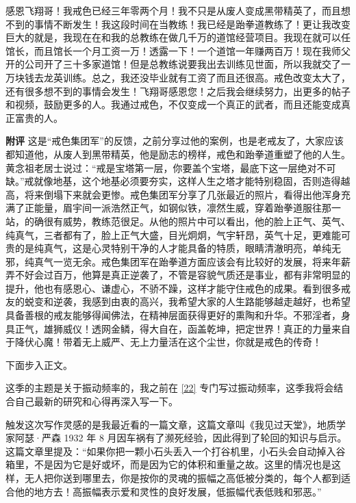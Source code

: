 \begin{case}
    感恩飞翔哥！我戒色已经三年零两个月！我不只是从废人变成黑带精英了，而且想不到的事情不断发生！我这段时间在当教练！我已经是跆拳道教练了！更让我改变巨大的就是，我现在在和我的总教练在做几千万的道馆经营项目。我现在就可以任馆长，而且馆长一个月工资一万！透露一下！一个道馆一年赚两百万！现在我师父开的公司开了三十多家道馆！但是总教练说要我出去训练见世面，所以我就交了一万块钱去龙英训练。总之，我还没毕业就有工资了而且还很高。戒色改变太大了，还有很多想不到的事情会发生！飞翔哥感恩您！之后我会继续努力，出更多的帖子和视频，鼓励更多的人。我通过戒色，不仅变成一个真正的武者，而且还能变成真正富贵的人。

    \textbf{附评} 这是“戒色集团军”的反馈，之前分享过他的案例，也是老戒友了，大家应该都知道他，从废人到黑带精英，他是励志的榜样，戒色和跆拳道重塑了他的人生。黄念祖老居士说过：“戒是宝塔第一层，你要盖个宝塔，最底下这一层绝对不可缺。”戒就像地基，这个地基必须要夯实，这样人生之塔才能特别稳固，否则造得越高，将来倒塌下来就会更惨。戒色集团军分享了几张最近的照片，看得出他浑身充满了正能量，眉宇间一派浩然正气，如钢似铁，凛然生威，穿着跆拳道服往那一站，的确很有威势，教练范很足。从他的照片中可以看出，他的脸上正气、英气、纯真气，三者都有了，脸上正气大盛，目光炯炯，气宇轩昂，英气十足，更难能可贵的是纯真气，这是心灵特别干净的人才能具备的特质，眼睛清澈明亮，单纯无邪，纯真气一览无余。戒色集团军在跆拳道方面应该会有比较好的发展，将来年薪弄不好会过百万，他算是真正逆袭了，不管是容貌气质还是事业，都有非常明显的提升，他也有感恩心、谦虚心，不骄不躁，这样才能守住戒色的成果。看到很多戒友的蜕变和逆袭，我感到由衷的高兴，我希望大家的人生路能够越走越好，也希望具备善根的戒友能够得闻佛法，在精神层面获得更好的熏陶和升华。不邪淫者，身具正气，雄狮威仪！透网金鳞，得大自在，函盖乾坤，把定世界！真正的力量来自于降伏心魔！带着无上威严、无上力量活在这个尘世，你就是戒色的传奇！
\end{case}

下面步入正文。

这季的主题是关于振动频率的，我之前在 \ref{22} 专门写过振动频率，这季我将会结合自己最新的研究和心得再深入写一下。

触发这次写作灵感的是我最近看的一篇文章，这篇文章叫《我见过天堂》，地质学家阿瑟·严森 1932 年 8 月因车祸有了濒死经验，因此得到了轮回的知识与启示。这篇文章里提及：“如果你把一颗小石头丢入一个打谷机里，小石头会自动掉入谷箱里，不是因为它是好或坏，而是因为它的体积和重量之故。这里的情况也是这样，无人把你送到哪里去，你是按你的灵魂的振幅之高低被分类的，每个人都到适合他的地方去！高振幅表示爱和灵性的良好发展，低振幅代表低贱和邪恶。”

